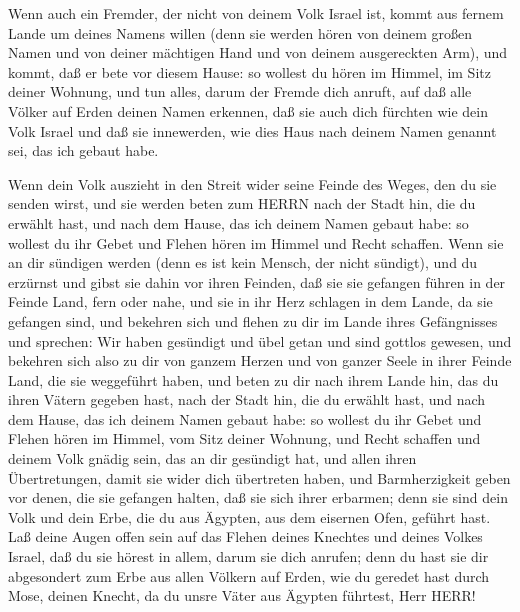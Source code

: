  Wenn auch ein Fremder, der nicht von deinem Volk Israel
ist, kommt aus fernem Lande um deines Namens willen  (denn
sie werden hören von deinem großen Namen und von deiner mächtigen Hand
und von deinem ausgereckten Arm), und kommt, daß er bete vor diesem
Hause:  so wollest du hören im Himmel, im Sitz deiner
Wohnung, und tun alles, darum der Fremde dich anruft, auf daß alle
Völker auf Erden deinen Namen erkennen, daß sie auch dich fürchten wie
dein Volk Israel und daß sie innewerden, wie dies Haus nach deinem Namen
genannt sei, das ich gebaut habe.

 Wenn dein Volk auszieht in den Streit wider seine Feinde
des Weges, den du sie senden wirst, und sie werden beten zum HERRN nach
der Stadt hin, die du erwählt hast, und nach dem Hause, das ich deinem
Namen gebaut habe:  so wollest du ihr Gebet und Flehen
hören im Himmel und Recht schaffen.  Wenn sie an dir
sündigen werden (denn es ist kein Mensch, der nicht sündigt), und du
erzürnst und gibst sie dahin vor ihren Feinden, daß sie sie gefangen
führen in der Feinde Land, fern oder nahe,  und sie in ihr
Herz schlagen in dem Lande, da sie gefangen sind, und bekehren sich und
flehen zu dir im Lande ihres Gefängnisses und sprechen: Wir haben
gesündigt und übel getan und sind gottlos gewesen,  und
bekehren sich also zu dir von ganzem Herzen und von ganzer Seele in
ihrer Feinde Land, die sie weggeführt haben, und beten zu dir nach ihrem
Lande hin, das du ihren Vätern gegeben hast, nach der Stadt hin, die du
erwählt hast, und nach dem Hause, das ich deinem Namen gebaut habe:
 so wollest du ihr Gebet und Flehen hören im Himmel, vom
Sitz deiner Wohnung, und Recht schaffen  und deinem Volk
gnädig sein, das an dir gesündigt hat, und allen ihren Übertretungen,
damit sie wider dich übertreten haben, und Barmherzigkeit geben vor
denen, die sie gefangen halten, daß sie sich ihrer erbarmen;
 denn sie sind dein Volk und dein Erbe, die du aus Ägypten,
aus dem eisernen Ofen, geführt hast.  Laß deine Augen offen
sein auf das Flehen deines Knechtes und deines Volkes Israel, daß du sie
hörest in allem, darum sie dich anrufen;  denn du hast sie
dir abgesondert zum Erbe aus allen Völkern auf Erden, wie du geredet
hast durch Mose, deinen Knecht, da du unsre Väter aus Ägypten führtest,
Herr HERR!

